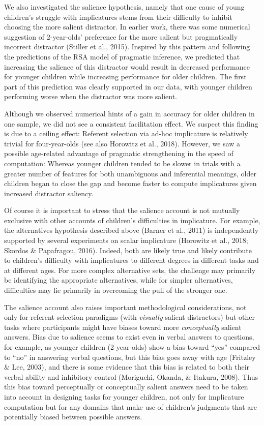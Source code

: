 \documentclass[man]{apa6}
\theoremstyle{definition}
\theoremstyle{definition}
\theoremstyle{definition}
\theoremstyle{remark}
\begin{document}
We also investigated the salience hypothesis, namely that one cause of
young children's struggle with implicatures stems from their difficulty
to inhibit choosing the more salient distractor. In earlier work, there
was some numerical suggestion of 2-year-olds' preference for the more
salient but pragmatically incorrect distractor (Stiller et al., 2015).
Inspired by this pattern and following the predictions of the RSA model
of pragmatic inference, we predicted that increasing the salience of
this distractor would result in decreased performance for younger
children while increasing performance for older children. The first part
of this prediction was clearly supported in our data, with younger
children performing worse when the distractor was more salient.

Although we observed numerical hints of a gain in accuracy for older
children in one sample, we did not see a consistent facilitation effect.
We suspect this finding is due to a ceiling effect: Referent selection
via ad-hoc implicature is relatively trivial for four-year-olds (see
also Horowitz et al., 2018). However, we saw a possible age-related
advantage of pragmatic strengthening in the speed of computation:
Whereas younger children tended to be slower in trials with a greater
number of features for both unambiguous and inferential meanings, older
children began to close the gap and become faster to compute
implicatures given increased distractor saliency.

Of course it is important to stress that the salience account is not
mutually exclusive with other accounts of children's difficulties in
implicature. For example, the alternatives hypothesis described above
(Barner et al., 2011) is independently supported by several experiments
on scalar implicature (Horowitz et al., 2018; Skordos \& Papafragou,
2016). Indeed, both are likely true and likely contribute to children's
difficulty with implicatures to different degrees in different tasks and
at different ages. For more complex alternative sets, the challenge may
primarily be identifying the appropriate alternatives, while for simpler
alternatives, difficulties may lie primarily in overcoming the pull of
the stronger one.

The salience account also raises important methodological
considerations, not only for referent-selection paradigms (with
\emph{visually} salient distractors) but other tasks where participants
might have biases toward more \emph{conceptually} salient answers. Bias
due to salience seems to exist even in verbal answers to questions, for
example, as younger children (2-year-olds) show a bias toward
\enquote{yes} compared to \enquote{no} in answering verbal questions,
but this bias goes away with age (Fritzley \& Lee, 2003), and there is
some evidence that this bias is related to both their verbal ability and
inhibitory control (Moriguchi, Okanda, \& Itakura, 2008). Thus this bias
toward perceptually or conceptually salient answers need to be taken
into account in designing tasks for younger children, not only for
implicature computation but for any domains that make use of children's
judgments that are potentially biased between possible answers.
\end{document}
